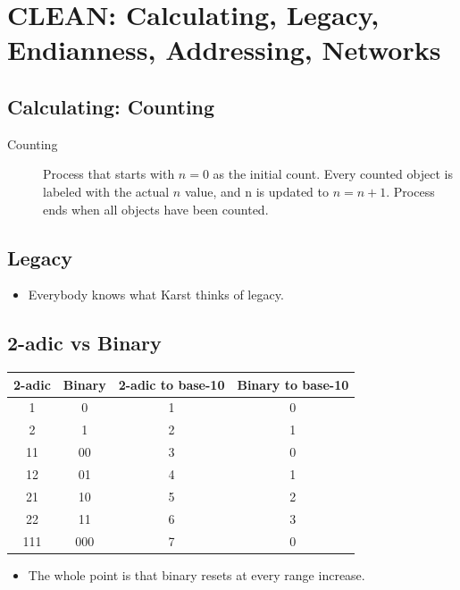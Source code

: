 \documentclass{article}
\begin{document}
\section{CLEAN: Calculating, Legacy, Endianness, Addressing, Networks}

\subsection{Calculating: Counting}

\begin{description}
	\item[Counting] Process that starts with $n=0$ as the initial count. Every counted object is labeled with the actual $n$ value, and n is updated to $n=n+1$. Process ends when all objects have been counted.
\end{description}
	
	
\subsection{Legacy}

\begin{itemize}
	\item Everybody knows what Karst thinks of legacy.
\end{itemize}


\subsection{2-adic vs Binary}

\begin{center}
  \begin{tabular}{ c | c | c | c }
    2-adic & Binary & 2-adic to base-10 & Binary to base-10 \\ \hline
    1 & 0 & 1 & 0 \\ \hline
    2 & 1 & 2 & 1 \\ \hline
    11 & 00 & 3 & 0 \\ \hline
    12 & 01 & 4 & 1 \\ \hline
    21 & 10 & 5 & 2 \\ \hline
    22 & 11 & 6 & 3 \\ \hline
    111 & 000 & 7 & 0 \\ 
    \hline
  \end{tabular}
\end{center}

\begin{itemize}
	\item The whole point is that binary resets at every range increase.
\end{itemize}
\end{document}
